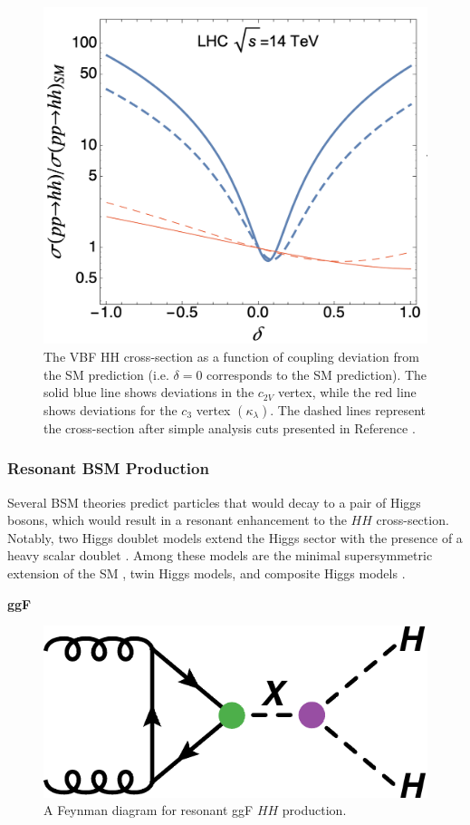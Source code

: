 \begin{figure}[!ht]
    \centering
    \includegraphics[width=.7\textwidth]{chapters/chapter1_theory/images/coupling_xsec.png}
    \caption[The VBF HH cross-section as a function of coupling deviation from the \gls{SM} prediction.]{The VBF HH cross-section as a function of coupling deviation from the \gls{SM} prediction (i.e. $\delta=0$ corresponds to the \gls{SM} prediction). The solid blue line shows deviations in the $c_{2V}$ vertex, while the red line shows deviations for the $c_{3}$ vertex $(\kappa_\lambda)$. The dashed lines represent the cross-section after simple analysis cuts presented in Reference \cite{vbfhh}.}
    \label{fig:c2v-xsec}
\end{figure}



\subsubsection{Resonant BSM Production}

Several \gls{BSM} theories predict particles that would decay to a pair of Higgs bosons, which would result in a resonant enhancement to the $HH$ cross-section. Notably, two Higgs doublet models extend the Higgs sector with the presence of a heavy scalar doublet \cite{THDM}. Among these models are the minimal supersymmetric extension of the \gls{SM} \cite{mssm}, twin Higgs models, and composite Higgs models \cite{compositeHiggs}.

\noindent\textbf{\gls{ggF}}\\
\indent


\begin{figure}[!ht]
    \centering
    \includegraphics[width=.6\textwidth]{chapters/chapter1_theory/images/hh_res_ggf.pdf}
    \caption{A Feynman diagram for resonant ggF  $HH$ production.}
    \label{fig:ggf-resonant}
\end{figure}

